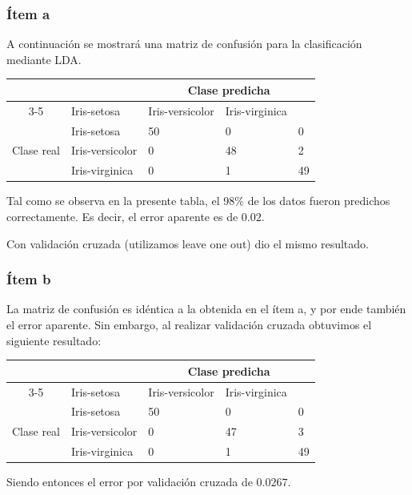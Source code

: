 \subsubsection*{Ítem a}
A continuación se mostrará una matriz de confusión para la clasificación mediante LDA.
\begin{center}
    \begin{tabular}{|c|l|l|l|l|}
    \hline
    \multicolumn{2}{|l|}{\multirow{2}{*}{}}       & \multicolumn{3}{c|}{Clase predicha}            \\ \cline{3-5} 
    \multicolumn{2}{|l|}{}                        & Iris-setosa & Iris-versicolor & Iris-virginica \\ \hline
    \multirow{3}{*}{Clase real} & Iris-setosa     & 50          & 0               & 0              \\ \cline{2-5} 
                                & Iris-versicolor & 0           & 48              & 2              \\ \cline{2-5} 
                                & Iris-virginica  & 0           & 1               & 49             \\ \hline
    \end{tabular}
\end{center}

Tal como se observa en la presente tabla, el 98\% de los datos fueron predichos correctamente. Es decir, el error aparente es de $0.02$. 

Con validación cruzada (utilizamos leave one out) dio el mismo resultado.\\

\subsubsection*{Ítem b}
La matriz de confusión es idéntica a la obtenida en el ítem a, y por ende también el error aparente. Sin embargo, al realizar validación cruzada obtuvimos el siguiente resultado:

\begin{center}
    \begin{tabular}{|c|l|l|l|l|}
    \hline
    \multicolumn{2}{|l|}{\multirow{2}{*}{}}       & \multicolumn{3}{c|}{Clase predicha}            \\ \cline{3-5} 
    \multicolumn{2}{|l|}{}                        & Iris-setosa & Iris-versicolor & Iris-virginica \\ \hline
    \multirow{3}{*}{Clase real} & Iris-setosa     & 50          & 0               & 0              \\ \cline{2-5} 
                                & Iris-versicolor & 0           & 47              & 3             \\ \cline{2-5} 
                                & Iris-virginica  & 0           & 1               & 49             \\ \hline
    \end{tabular}
\end{center}

Siendo entonces el error por validación cruzada de $0.0267$.


